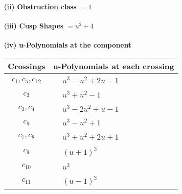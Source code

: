 \documentclass[1p]{elsarticle_modified}
\theoremstyle{definition}
\begin{document}
\flushleft \textbf{(ii) Obstruction class $= 1$}\\~\\
\flushleft \textbf{(iii) Cusp Shapes $= u^2+4$}\\~\\
\newpage\renewcommand{\arraystretch}{1}
\flushleft \textbf{(iv) u-Polynomials at the component}\newline \\
\begin{tabular}{m{50pt}|m{274pt}}
Crossings & \hspace{64pt}u-Polynomials at each crossing \\
\hline $$\begin{aligned}c_{1},c_{5},c_{12}\end{aligned}$$&$\begin{aligned}
&u^3- u^2+2 u-1
\end{aligned}$\\
\hline $$\begin{aligned}c_{2}\end{aligned}$$&$\begin{aligned}
&u^3+u^2-1
\end{aligned}$\\
\hline $$\begin{aligned}c_{3},c_{4}\end{aligned}$$&$\begin{aligned}
&u^3-2 u^2+u-1
\end{aligned}$\\
\hline $$\begin{aligned}c_{6}\end{aligned}$$&$\begin{aligned}
&u^3- u^2+1
\end{aligned}$\\
\hline $$\begin{aligned}c_{7},c_{8}\end{aligned}$$&$\begin{aligned}
&u^3+u^2+2 u+1
\end{aligned}$\\
\hline $$\begin{aligned}c_{9}\end{aligned}$$&$\begin{aligned}
&(u+1)^3
\end{aligned}$\\
\hline $$\begin{aligned}c_{10}\end{aligned}$$&$\begin{aligned}
&u^3
\end{aligned}$\\
\hline $$\begin{aligned}c_{11}\end{aligned}$$&$\begin{aligned}
&(u-1)^3
\end{aligned}$\\
\hline
\end{tabular}\\~\\
\end{document}
